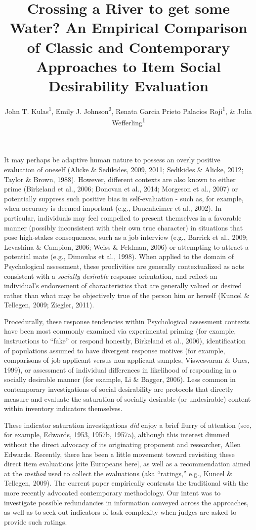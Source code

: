 \documentclass[
  ,jou]{apa6}
\title{Crossing a River to get some Water? An Empirical Comparison of Classic and Contemporary Approaches to Item Social Desirability Evaluation}
\author{John T. Kulas\textsuperscript{1}, Emily J. Johnson\textsuperscript{2}, Renata Garcia Prieto Palacios Roji\textsuperscript{1}, \& Julia Wefferling\textsuperscript{1}}
\date{}
\affiliation{\vspace{0.5cm}\textsuperscript{1} Montclair State University\\\textsuperscript{2} St.~Cloud State University}
\begin{document}
\maketitle

It may perhaps be adaptive human nature to possess an overly positive evaluation of oneself (Alicke \& Sedikides, 2009, 2011; Sedikides \& Alicke, 2012; Taylor \& Brown, 1988). However, different contexts are also known to either prime (Birkeland et al., 2006; Donovan et al., 2014; Morgeson et al., 2007) or potentially suppress such positive bias in self-evaluation - such as, for example, when accuracy is deemed important (e.g., Dauenheimer et al., 2002). In particular, individuals may feel compelled to present themselves in a favorable manner (possibly inconsistent with their own true character) in situations that pose high-stakes consequences, such as a job interview (e.g., Barrick et al., 2009; Levashina \& Campion, 2006; Weiss \& Feldman, 2006) or attempting to attract a potential mate (e.g., Dimoulas et al., 1998). When applied to the domain of Psychological assessment, these proclivities are generally contextualized as acts consistent with a \emph{socially desirable} response orientation, and reflect an individual's endorsement of characteristics that are generally valued or desired rather than what may be objectively true of the person him or herself (Kuncel \& Tellegen, 2009; Ziegler, 2011).

Procedurally, these response tendencies within Psychological assessment contexts have been most commonly examined via experimental priming (for example, instructions to ``fake'' or respond honestly, Birkeland et al., 2006), identification of populations assumed to have divergent response motives (for example, comparisons of job applicant versus non-applicant samples, Viswesvaran \& Ones, 1999), or assessment of individual differences in likelihood of responding in a socially desirable manner (for example, Li \& Bagger, 2006). Less common in contemporary investigations of social desirability are protocols that directly measure and evaluate the saturation of socially desirable (or undesirable) content within inventory indicators themselves.

These indicator saturation investigations \emph{did} enjoy a brief flurry of attention (see, for example, Edwards, 1953, 1957b, 1957a), although this interest dimmed without the direct advocacy of its originating proponent and researcher, Allen Edwards. Recently, there has been a little movement toward revisiting these direct item evaluations {[}cite Europeans here{]}, as well as a recommendation aimed at the \emph{method} used to collect the evaluations (aka ``ratings,'' e.g., Kuncel \& Tellegen, 2009). The current paper empirically contrasts the traditional with the more recently advocated contemporary methodology. Our intent was to investigate possible redundancies in information conveyed across the approaches, as well as to seek out indicators of task complexity when judges are asked to provide such ratings.
\end{document}
